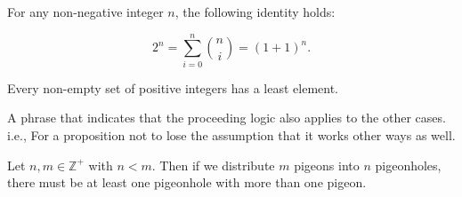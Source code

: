 \newpage

\begin{theo}

    \label{thm:binomial_2n}

    For any non-negative integer \(n\), the following identity holds:
    
    \[
    2^n = \sum_{i=0}^{n} \binom{n}{i} = (1 + 1)^n.
    \]

\end{theo}

\begin{Def}

    \label{def:well_ordering_principle}

    Every non-empty set of positive integers has a least element.
\end{Def}

\begin{Def}

    \label{def:wlog}

    A phrase that indicates that the proceeding logic also applies to the other cases.
    i.e., For a proposition not to lose the assumption that it works other ways as well.

\end{Def}
\begin{theo}

    Let \( n, m \in \mathbb{Z}^+ \) with \( n < m \). Then if we distribute \( m \) pigeons into \( n \) pigeonholes, there must be at least one pigeonhole with more than one pigeon.
\end{theo}





